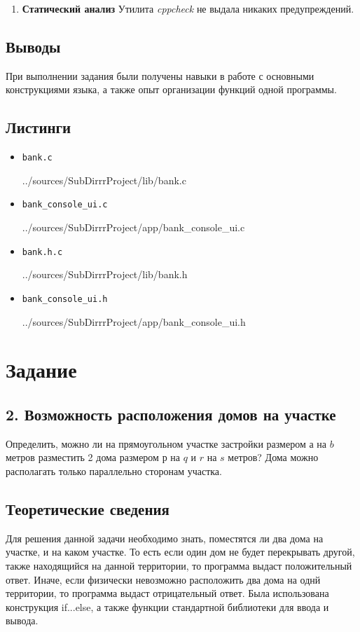 \documentclass[12pt,a4paper]{report}
\begin{document}
\begin{enumerate}
\item \textbf{Статический анализ}
\hspace{\parindent}
Утилита \textit{cppcheck} не выдала никаких предупреждений.
\end{enumerate}

\subsection{Выводы}
\hspace{\parindent}
При выполнении задания были получены навыки в работе с основными конструкциями языка, а также опыт организации функций одной программы.
\subsection*{Листинги}
\begin{itemize}
\item[] \verb-bank.c-

{../sources/SubDirrrProject/lib/bank.c}
\item[] \verb-bank_console_ui.c-

{../sources/SubDirrrProject/app/bank_console_ui.c}
\item[] \verb-bank.h.c-

{../sources/SubDirrrProject/lib/bank.h}
\item[] \verb-bank_console_ui.h-

{../sources/SubDirrrProject/app/bank_console_ui.h}
\end{itemize}

%

\section{Задание}
\subsection{2. Возможность расположения домов на участке}
\hspace{\parindent}
Определить, можно ли на прямоугольном участке застройки размером $а$ на $b$ метров разместить 2 дома размером $р$ на $q$ и $r$ на $s$ метров? Дома можно располагать только параллельно сторонам участка.

\subsection{Теоретические сведения}
\hspace{\parindent}
Для решения данной задачи необходимо знать, поместятся ли два дома на участке, и на каком участке. То есть если один дом не будет перекрывать другой, также находящийся на данной территории, то программа выдаст положительный ответ. Иначе, если физически невозможно расположить два дома на однй территории, то программа выдаст отрицательный ответ. Была использована конструкция if...else, а также  функции стандартной библиотеки для ввода и вывода.
\end{document}
